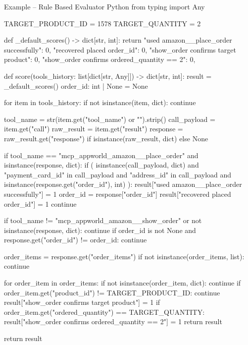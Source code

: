 \documentclass{llmxive}
\begin{document}
\begin{tcbCodeListing}{Example -- Rule Based Evaluator
}{Python}
from typing import Any

TARGET_PRODUCT_ID = 1578
TARGET_QUANTITY = 2


def _default_scores() -> dict[str, int]:
    return {
        "used amazon__place_order successfully": 0,
        "recovered placed order_id": 0,
        "show_order confirms target product": 0,
        "show_order confirms ordered_quantity == 2": 0,
    }


def score(tools_history: list[dict[str, Any]]) -> dict[str, int]:
    result = _default_scores()
    order_id: int | None = None

    for item in tools_history:
        if not isinstance(item, dict):
            continue

        tool_name = str(item.get("tool_name") or "").strip()
        call_payload = item.get("call")
        raw_result = item.get("result")
        response = raw_result.get("response") if isinstance(raw_result, dict) else None

        if tool_name == "mcp_appworld_amazon__place_order" and isinstance(response, dict):
            if (
                isinstance(call_payload, dict)
                and "payment_card_id" in call_payload
                and "address_id" in call_payload
                and isinstance(response.get("order_id"), int)
            ):
                result["used amazon__place_order successfully"] = 1
                order_id = response["order_id"]
                result["recovered placed order_id"] = 1
            continue

        if tool_name != "mcp_appworld_amazon__show_order" or not isinstance(response, dict):
            continue
        if order_id is not None and response.get("order_id") != order_id:
            continue

        order_items = response.get("order_items")
        if not isinstance(order_items, list):
            continue

        for order_item in order_items:
            if not isinstance(order_item, dict):
                continue
            if order_item.get("product_id") != TARGET_PRODUCT_ID:
                continue
            result["show_order confirms target product"] = 1
            if order_item.get("ordered_quantity") == TARGET_QUANTITY:
                result["show_order confirms ordered_quantity == 2"] = 1
            return result

    return result
\end{tcbCodeListing}
\end{document}
